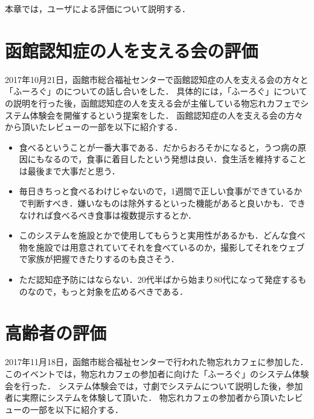 \documentclass[../report]{subfiles}
\begin{document}
本章では，ユーザによる評価について説明する．

\section{函館認知症の人を支える会の評価} \label{sec:7_hyouka_monowasurecafe}
2017年10月21日，函館市総合福祉センターで函館認知症の人を支える会の方々と「ふーろぐ」のについての話し合いをした．
具体的には，「ふーろぐ」についての説明を行った後，函館認知症の人を支える会が主催している物忘れカフェでシステム体験会を開催するという提案をした．
函館認知症の人を支える会の方々から頂いたレビューの一部を以下に紹介する．

\begin{itemize}
    \item 食べるということが一番大事である．だからおろそかになると，うつ病の原因にもなるので，食事に着目したという発想は良い．食生活を維持することは最後まで大事だと思う．
    \item 毎日きちっと食べるわけじゃないので，1週間で正しい食事ができているかで判断すべき．嫌いなものは除外するといった機能があると良いかも．できなければ食べるべき食事は複数提示するとか．
    \item このシステムを施設とかで使用してもらうと実用性があるかも．どんな食べ物を施設では用意されていてそれを食べているのか，撮影してそれをウェブで家族が把握できたりするのも良さそう．
    \item ただ認知症予防にはならない．20代半ばから始まり80代になって発症するものなので，もっと対象を広めるべきである．
\end{itemize}

\section{高齢者の評価} \label{sec:7_hyouka_system}
2017年11月18日，函館市総合福祉センターで行われた物忘れカフェに参加した．
このイベントでは，物忘れカフェの参加者に向けた「ふーろぐ」のシステム体験会を行った．
システム体験会では，寸劇でシステムについて説明した後，参加者に実際にシステムを体験して頂いた．
物忘れカフェの参加者から頂いたレビューの一部を以下に紹介する．
\end{document}
